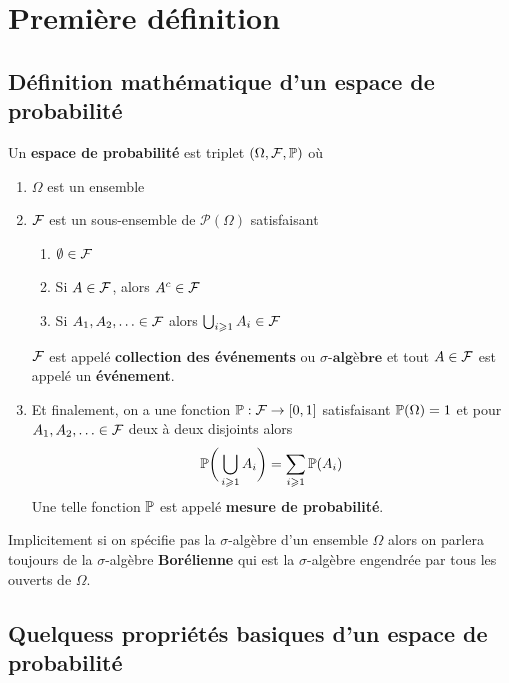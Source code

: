 \chapter{Première définition}

\section{Définition mathématique d'un espace de probabilité}
\begin{definition} \label{def: Espaca de probabilité}
	Un \textbf{espace de probabilité} est triplet $(\Omega, \F, \P)$ où
	\begin{enumerate}
		\item $\Omega$  est un ensemble 
		\item $\F$ est un sous-ensemble de $\mathcal P(\Omega)$ satisfaisant
		\begin{enumerate}
			\item $\emptyset \in \F$
			\item Si $A \in \F$, alors $A^c \in \F$
			\item Si $A_1, A_2, \ldots \in \F$ alors $\bigcup_{i \geqslant 1} A_i  \in \F$
		\end{enumerate}
		$\F$ est appelé \textbf{collection des événements} ou $\textbf{$\sigma$-algèbre}$ et tout $A \in \F$ est appelé un \textbf{événement}.
		\item Et finalement, on a une fonction $\P : \F \to [0,1]$ satisfaisant $\P(\Omega) = 1$ et pour $A_1, A_2, \ldots \in \F$ deux à deux disjoints alors
		\begin{equation} \label{eq: sigma additivité}
		\P\bigg( \bigcup_{i \geqslant 1} A_i \bigg) = \sum_{i \geqslant 1} \P(A_i)
		\end{equation}
		Une telle fonction $\P$ est appelé \textbf{mesure de probabilité}.
		
	\end{enumerate}
	
\end{definition}

\begin{remarque}
	Implicitement si on spécifie pas la $\sigma$-algèbre d'un ensemble $\Omega$ alors on parlera toujours de la $\sigma$-algèbre \textbf{Borélienne} qui est la $\sigma$-algèbre engendrée par tous les ouverts de $\Omega$. 
\end{remarque}

\section{Quelquess propriétés basiques d'un espace de probabilité}

